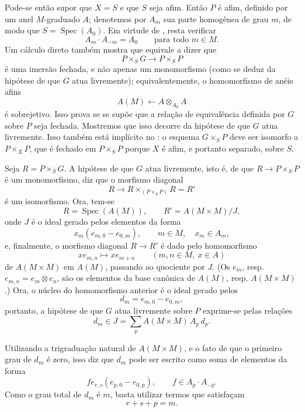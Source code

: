 Pode-se então supor que \(X=S\) e que \(S\) seja afim. Então
\(P\) é afim, definido por um anel \(M\)-graduado \(A\); denotemos por
\(A_m\) sua parte homogênea de grau \(m\), de modo que
\(S=\operatorname{Spec}(A_0)\). Em virtude de
, resta verificar
\[
  A_m\cdot A_{-m}=A_0
  \qquad\text{para todo \(m\in M\).}
  \tag{x}\label{sga3:viii:theorem:5:1:eq:x:01}
\]
Um cálculo direto também mostra que
 equivale a dizer que
\[
  P\times_SG\longrightarrow P\times_SP
\]
é uma imersão fechada, e não apenas um monomorfismo (como se deduz da
hipótese de que \(G\) atua livremente); equivalentemente, o homomorfismo
de anéis afins
\[
  A(M)\longleftarrow A\otimes_{A_0}A
\]
é sobrejetivo.
Isso prova  se se supõe que a
relação de equivalência definida por \(G\) sobre \(P\) seja fechada.
Mostremos que isso decorre da hipótese de que
\(G\) atua livremente. Isso também está implícito no
: o esquema
\(G\times_SP\) deve ser isomorfo a \(P\times_XP\), que é fechado em
\(P\times_SP\) porque \(X\) é afim, e portanto separado, sobre \(S\).

Seja \(R=P\times_SG\). A hipótese de que \(G\) atua livremente, isto é,
de que \(R\to P\times_SP\) é um monomorfismo, diz que o morfismo diagonal
\[
  R\longrightarrow
  R\times_{(P\times_SP)}R=R'
\]
é um isomorfismo. Ora, tem-se
\[
  R=\operatorname{Spec}(A(M)),\qquad R'=A(M\times M)/J,
\]
onde \(J\) é o ideal gerado pelos elementos da forma
\[
  x_m(e_{m,0}-e_{0,m}),\qquad m\in M,\quad x_m\in A_m,
\]
e, finalmente, o morfismo diagonal \(R\to R'\) é dado pelo homomorfismo
\[
  x e_{m,n}\longmapsto x e_{m+n}\qquad(m,n\in M,\ x\in A)
\]
de \(A(M\times M)\) em \(A(M)\), passando ao quociente por \(J\).
(Os \(e_m\), resp. \(e_{m,n}=e_m\otimes e_n\), são os elementos da
base canônica de \(A(M)\), resp. \(A(M\times M)\).) Ora, o núcleo do
homomorfismo anterior é o ideal gerado pelos
\[
  d_m=e_{m,0}-e_{0,m},
\]
portanto, a hipótese de que \(G\) atua livremente sobre \(P\) exprime-se
pelas relações
\[
  d_m\in J=\sum_p A(M\times M)\,A_p\,d_p.
  \tag{xx}\label{sga3:viii:theorem:5:1:eq:xx:01}
\]

Utilizando a trigraduação natural de \(A(M\times M)\), e o fato de que
o primeiro grau de \(d_m\) é zero, isso diz que \(d_m\) pode ser escrito
como soma de elementos da forma
\[
  f e_{r,s}(e_{p,0}-e_{0,p}),
  \qquad f\in A_p\cdot A_{-p}.
\]
Como o grau total de \(d_m\) é \(m\), basta utilizar termos que
satisfaçam
\[
  r+s+p=m.
\]

